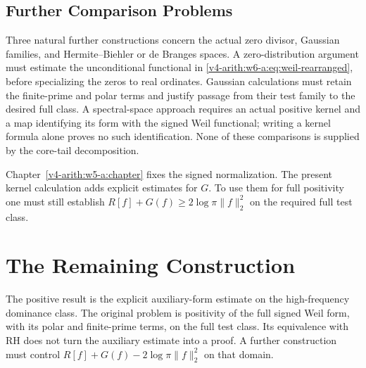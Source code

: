 \subsection{Further Comparison Problems}
\label{v4-arith:w6-a:irreducible:open-obstructions}

\begin{remark}
\label{v4-arith:w6-a:rem:live-constructions}
Three natural further constructions concern the actual zero divisor,
Gaussian families, and Hermite--Biehler or de Branges spaces. A
zero-distribution argument must estimate the unconditional functional
in \eqref{v4-arith:w6-a:eq:weil-rearranged}, before specializing the
zeros to real ordinates. Gaussian calculations must retain the
finite-prime and polar terms and justify passage from their test
family to the desired full class. A spectral-space approach requires
an actual positive kernel and a map identifying its form with the
signed Weil functional; writing a kernel formula alone proves no
such identification. None of these comparisons is supplied by the
core-tail decomposition.
\end{remark}

\begin{remark}
\label{v4-arith:w6-a:rem:compare-w5}
Chapter~\ref{v4-arith:w5-a:chapter} fixes the signed normalization.
The present kernel calculation adds explicit estimates for \(G\).
To use them for full positivity one must still establish
\(R[f]+G(f)\geq2\log\pi\|f\|_2^2\) on the required full test class.
\end{remark}

\section{The Remaining Construction}
\label{v4-arith:w6-a:summary}

\begin{remark}
\label{v4-arith:w6-a:rem:beilinson-closing}
The positive result is the explicit auxiliary-form estimate on the
high-frequency dominance class. The original problem is positivity
of the full signed Weil form, with its polar and finite-prime
terms, on the full test class. Its equivalence with RH does not turn
the auxiliary estimate into a proof. A further construction must
control \(R[f]+G(f)-2\log\pi\|f\|_2^2\) on that domain.
\end{remark}

